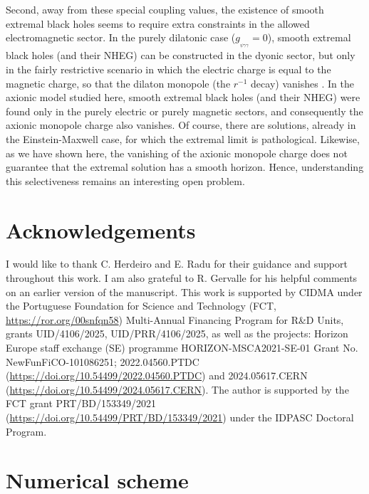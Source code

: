 \documentclass[11pt]{article}
\numberwithin{equation}{section} %
\begin{document}
Second, away from these special coupling values, the existence of smooth extremal black holes seems to require extra constraints in the allowed electromagnetic sector. In the purely dilatonic case ($g_{_{\psi\gamma\gamma}}=0$), smooth extremal black holes (and their NHEG) can be constructed in the dyonic sector,  but only in the fairly restrictive scenario in which the electric charge is equal to the magnetic charge, so that the dilaton monopole (the $r^{-1}$ decay) vanishes \cite{Blazquez-Salcedo:2025cpu,Herdeiro:2025blx}. In the axionic model studied here, smooth extremal black holes (and their NHEG) were found only in the purely electric or purely magnetic sectors, and consequently the axionic monopole charge also vanishes.  Of course, there are solutions, already in the Einstein-Maxwell case, for which the extremal limit is pathological. Likewise, as we have shown here, the vanishing of the axionic monopole charge does not guarantee that the extremal solution has a smooth horizon. Hence, understanding this selectiveness remains an interesting open problem.



\section*{Acknowledgements}

I would like to thank C. Herdeiro and E. Radu for their guidance and support throughout this work. I am also grateful to R. Gervalle for his helpful comments on an earlier version of the manuscript. This work is supported by CIDMA under the Portuguese Foundation for Science and Technology (FCT, \url{https://ror.org/00snfqn58}) Multi-Annual Financing Program for R\&D Units, grants UID/4106/2025,  UID/PRR/4106/2025, as well as the projects: Horizon Europe staff exchange (SE) programme HORIZON-MSCA2021-SE-01 Grant No. NewFunFiCO-101086251;  2022.04560.PTDC (\url{https://doi.org/10.54499/2022.04560.PTDC}) and 2024.05617.CERN (\url{https://doi.org/10.54499/2024.05617.CERN}). The author is supported by the FCT grant PRT/BD/153349/2021 (\url{https://doi.org/10.54499/PRT/BD/153349/2021}) under
the IDPASC Doctoral Program.


\appendix
\section{Numerical scheme}
\label{sec:numerics}
\end{document}
